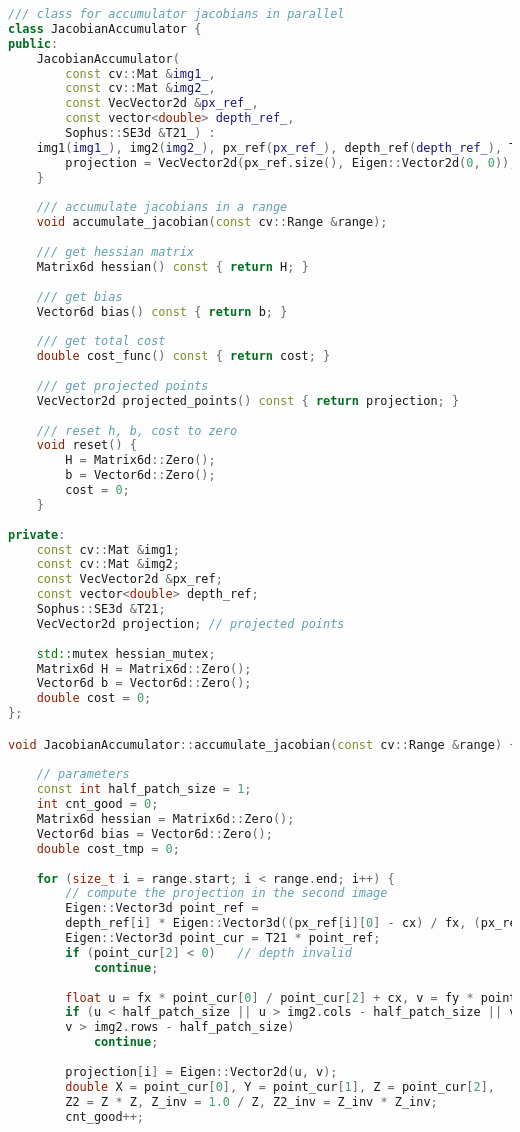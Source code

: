 \begin{lstlisting}[language=c++,caption=slambook2/ch8/direct_method.cpp（片段）]
/// class for accumulator jacobians in parallel
class JacobianAccumulator {
public:
	JacobianAccumulator(
		const cv::Mat &img1_,
		const cv::Mat &img2_,
		const VecVector2d &px_ref_,
		const vector<double> depth_ref_,
		Sophus::SE3d &T21_) :
	img1(img1_), img2(img2_), px_ref(px_ref_), depth_ref(depth_ref_), T21(T21_) {
		projection = VecVector2d(px_ref.size(), Eigen::Vector2d(0, 0));
	}
	
	/// accumulate jacobians in a range
	void accumulate_jacobian(const cv::Range &range);
	
	/// get hessian matrix
	Matrix6d hessian() const { return H; }
	
	/// get bias
	Vector6d bias() const { return b; }
	
	/// get total cost
	double cost_func() const { return cost; }
	
	/// get projected points
	VecVector2d projected_points() const { return projection; }
	
	/// reset h, b, cost to zero
	void reset() {
		H = Matrix6d::Zero();
		b = Vector6d::Zero();
		cost = 0;
	}
	
private:
	const cv::Mat &img1;
	const cv::Mat &img2;
	const VecVector2d &px_ref;
	const vector<double> depth_ref;
	Sophus::SE3d &T21;
	VecVector2d projection; // projected points
	
	std::mutex hessian_mutex;
	Matrix6d H = Matrix6d::Zero();
	Vector6d b = Vector6d::Zero();
	double cost = 0;
};

void JacobianAccumulator::accumulate_jacobian(const cv::Range &range) {
	
	// parameters
	const int half_patch_size = 1;
	int cnt_good = 0;
	Matrix6d hessian = Matrix6d::Zero();
	Vector6d bias = Vector6d::Zero();
	double cost_tmp = 0;
	
	for (size_t i = range.start; i < range.end; i++) {
		// compute the projection in the second image
		Eigen::Vector3d point_ref =
		depth_ref[i] * Eigen::Vector3d((px_ref[i][0] - cx) / fx, (px_ref[i][1] - cy) / fy, 1);
		Eigen::Vector3d point_cur = T21 * point_ref;
		if (point_cur[2] < 0)   // depth invalid
			continue;
		
		float u = fx * point_cur[0] / point_cur[2] + cx, v = fy * point_cur[1] / point_cur[2] + cy;
		if (u < half_patch_size || u > img2.cols - half_patch_size || v < half_patch_size ||
		v > img2.rows - half_patch_size)
			continue;
		
		projection[i] = Eigen::Vector2d(u, v);
		double X = point_cur[0], Y = point_cur[1], Z = point_cur[2],
		Z2 = Z * Z, Z_inv = 1.0 / Z, Z2_inv = Z_inv * Z_inv;
		cnt_good++;
		

\end{lstlisting}
